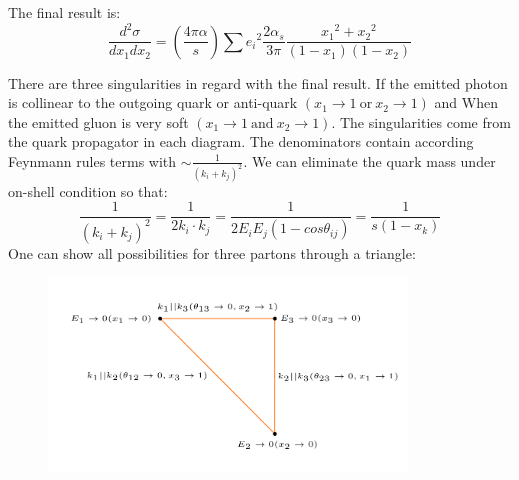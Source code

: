 The final result is:
\begin{equation}
\frac{d^2 \sigma}{dx_1 dx_2}= (\frac{4\pi \alpha}{s})\sum {e_i}^2 
\frac{2\alpha_s}{3\pi} \frac{{x_1}^2+{x_2}^2}{(1-x_1)(1-x_2)}
\end{equation}

There are three singularities in regard with the final result. 
If the emitted photon is collinear to the outgoing quark or anti-quark $ (x_1 \rightarrow 1 \:\text{or}\: x_2 \rightarrow 1) $ and When the emitted gluon is very soft $ (x_1 \rightarrow 1\: \text{and}\: x_2 \rightarrow 1 )$.
The singularities come from the quark propagator in each diagram. The denominators contain according Feynmann rules terms with $\sim \frac{1}{(k_i + k_j)^2}  $. We can eliminate the quark mass under on-shell condition so that:
\begin{equation}
\frac{1}{(k_i + k_j)^2}=\frac{1}{2k_i \cdot k_j}=\frac{1}{2E_iE_j(1-cos\theta_{ij})}=\frac{1}{s(1- x_k)}
\end{equation} 
One can show all possibilities for three partons through a triangle:
\pagebreak

\begin{figure}[ht!]
\centering
\includegraphics[width=0.85\textwidth]{images/Intro/triangle.png}
\end{figure}

